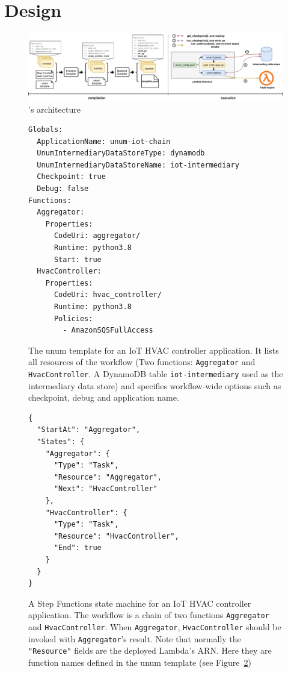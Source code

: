 \section{Design}\label{sec:design}

\begin{figure}[t]
    \centering
    \includegraphics[width=\textwidth]{figures/unum-arch.pdf}
    \caption{\name{}'s architecture}
    \label{fig:arch}
\end{figure}

\begin{figure}[]
    \begin{verbatim}
Globals:
  ApplicationName: unum-iot-chain
  UnumIntermediaryDataStoreType: dynamodb
  UnumIntermediaryDataStoreName: iot-intermediary
  Checkpoint: true
  Debug: false
Functions:
  Aggregator:
    Properties:
      CodeUri: aggregator/
      Runtime: python3.8
      Start: true
  HvacController:
    Properties:
      CodeUri: hvac_controller/
      Runtime: python3.8
      Policies:
        - AmazonSQSFullAccess
  \end{verbatim}
    \caption{The unum template for an IoT HVAC controller
    application. It lists all resources of the workflow (Two functions:
    \texttt{Aggregator} and \texttt{HvacController}. A DynamoDB table
    \texttt{iot-intermediary} used as the intermediary data store) and
    specifies workflow-wide options such as checkpoint, debug and
    application name.}
    \label{fig:iot-unum-template}
\end{figure}


\begin{figure}[]
    \begin{verbatim}
{
  "StartAt": "Aggregator",
  "States": {
    "Aggregator": {
      "Type": "Task",
      "Resource": "Aggregator",
      "Next": "HvacController"
    },
    "HvacController": {
      "Type": "Task",
      "Resource": "HvacController",
      "End": true
    }
  }
}
    \end{verbatim}
    \caption{A Step Functions state machine for an IoT HVAC controller
    application. The workflow is a chain of two functions \texttt{Aggregator}
    and \texttt{HvacController}. When \texttt{Aggregator},
    \texttt{HvacController} should be invoked with \texttt{Aggregator}'s
    result. Note that normally the \texttt{"Resource"} fields are the deployed
    Lambda's ARN. Here they are function names defined in the unum template
    (see Figure~\ref{fig:iot-unum-template})}
    \label{fig:iot-sf}
\end{figure}

